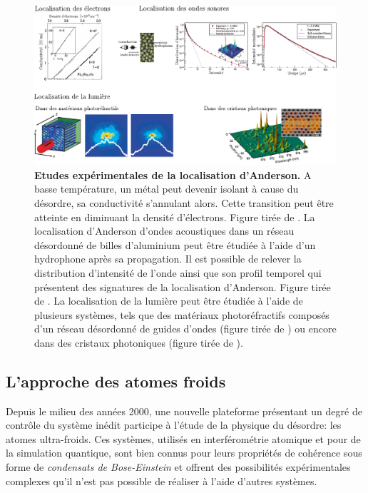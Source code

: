 \begin{figure}
\centering
\includegraphics[width=\textwidth]{Fig/Localisation/experiences_localisation_anderson.pdf}
\caption{\textbf{Etudes expérimentales de la localisation d'Anderson.} A basse température, un métal peut devenir isolant à cause du désordre, sa conductivité s'annulant alors. Cette transition peut être atteinte en diminuant la densité d'électrons. Figure tirée de \citep{katsumoto1987fine}. La localisation d'Anderson d'ondes acoustiques dans un réseau désordonné de billes d'aluminium peut être étudiée à l'aide d'un hydrophone après sa propagation. Il est possible de relever la distribution d'intensité de l'onde ainsi que son profil temporel qui présentent des signatures de la localisation d'Anderson. Figure tirée de \citep{hu2008localization}. La localisation de la lumière peut être étudiée à l'aide de plusieurs systèmes, tels que des matériaux photoréfractifs composés d'un réseau désordonné de guides d'ondes (figure tirée de \citep{schwartz2007transport}) ou encore dans des cristaux photoniques (figure tirée de \citep{sapienza2010cavity}).}
\label{fig:experiences_localisation_anderson}
\end{figure}






\subsection{L'approche des atomes froids}
Depuis le milieu des années 2000, une nouvelle plateforme présentant un degré de contrôle du système inédit participe à l'étude de la physique du désordre: les atomes ultra-froids. Ces systèmes, utilisés en interférométrie atomique et pour de la simulation quantique, sont bien connus pour leurs propriétés de cohérence sous forme de \emph{condensats de Bose-Einstein} et offrent des possibilités expérimentales complexes qu'il n'est pas possible de réaliser à l'aide d'autres systèmes.

